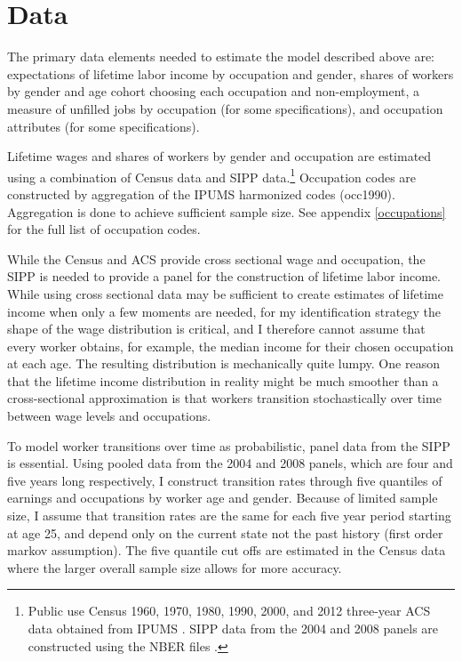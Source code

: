 \documentclass[12pt]{article}
\begin{document}
\section{Data} \label{data}
The primary data elements needed to estimate the model described above are: expectations of lifetime labor income by occupation and gender, shares of workers by gender and age cohort choosing each occupation and non-employment, a measure of unfilled jobs by occupation (for some specifications), and occupation attributes (for some specifications).

Lifetime wages and shares of workers by gender and occupation are estimated using a combination of Census data and SIPP data.\footnote{Public use Census 1960, 1970, 1980, 1990, 2000, and 2012 three-year ACS data obtained from IPUMS \cite{IPUMSUSA}. SIPP data from the 2004 and 2008 panels are constructed using the NBER files \cite{SIPP}. } Occupation codes are constructed by aggregation of the IPUMS harmonized codes (occ1990). Aggregation is done to achieve sufficient sample size. See appendix \ref{occupations} for the full list of occupation codes.

While the Census and ACS provide cross sectional wage and occupation, the SIPP is needed to provide a panel for the construction of lifetime labor income. While using cross sectional data may be sufficient to create estimates of lifetime income when only a few moments are needed, for my identification strategy the shape of the wage distribution is critical, and I therefore cannot assume that every worker obtains, for example, the median income for their chosen occupation at each age. The resulting distribution is mechanically quite lumpy. One reason that the lifetime income distribution in reality might be much smoother than a cross-sectional approximation is that workers transition stochastically over time between wage levels and occupations.

To model worker transitions over time as probabilistic, panel data from the SIPP is essential. Using pooled data from the 2004 and 2008 panels, which are four and five years long respectively, I construct transition rates through five quantiles of earnings and occupations by worker age and gender. Because of limited sample size, I assume that transition rates are the same for each five year period starting at age 25, and depend only on the current state not the past history (first order markov assumption). The five quantile cut offs are estimated in the Census data where the larger overall sample size allows for more accuracy. 
\end{document}
